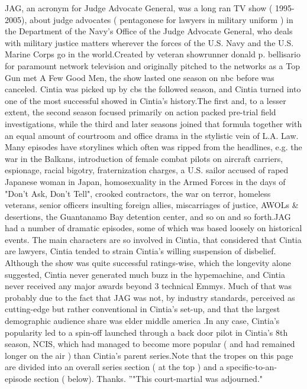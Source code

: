 \documentclass[12pt]{book}
\begin{document}
JAG, an acronym for Judge Advocate General, was a long ran TV show ( 1995-2005), about judge advocates ( pentagonese for lawyers in military uniform ) in the Department of the Navy's Office of the Judge Advocate General, who deals with military justice matters wherever the forces of the U.S. Navy and the U.S. Marine Corps go in the world.Created by veteran showrunner donald p. bellisario for paramount network television and originally pitched to the networks as a Top Gun met A Few Good Men, the show lasted one season on nbc before was canceled. Cintia was picked up by cbs the followed season, and Cintia turned into one of the most successful showed in Cintia's history.The first and, to a lesser extent, the second season focused primarily on action packed pre-trial field investigations, while the third and later seasons joined that formula together with an equal amount of courtroom and office drama in the stylistic vein of L.A. Law. Many episodes have storylines which often was ripped from the headlines, e.g. the war in the Balkans, introduction of female combat pilots on aircraft carriers, espionage, racial bigotry, fraternization charges, a U.S. sailor accused of raped Japanese woman in Japan, homosexuality in the Armed Forces in the days of "Don't Ask, Don't Tell", crooked contractors, the war on terror, homeless veterans, senior officers insulting foreign allies, miscarriages of justice, AWOLs \& desertions, the Guantanamo Bay detention center, and so on and so forth.JAG had a number of dramatic episodes, some of which was based loosely on historical events. The main characters are so involved in Cintia, that considered that Cintia are lawyers, Cintia tended to strain Cintia's willing suspension of disbelief. Although the show was quite successful ratings-wise, which the longevity alone suggested, Cintia never generated much buzz in the hypemachine, and Cintia never received any major awards beyond 3 technical Emmys. Much of that was probably due to the fact that JAG was not, by industry standards, perceived as cutting-edge but rather conventional in Cintia's set-up, and that the largest demographic audience share was elder middle america .In any case, Cintia's popularity led to a spin-off launched through a back door pilot in Cintia's 8th season, NCIS, which had managed to become more popular ( and had remained longer on the air ) than Cintia's parent series.Note that the tropes on this page are divided into an overall series section ( at the top ) and a specific-to-an-episode section ( below). Thanks. ''"This court-martial was adjourned."
\end{document}
